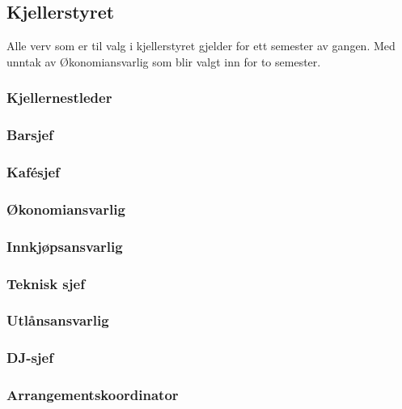\documentclass[10pt,norsk,a4paper,usenames,dvipsnames]{article}
\begin{document}
    \begin{minipage}[t]{0.49\textwidth}
        \subsection{Kjellerstyret} %
        Alle verv som er til valg i kjellerstyret gjelder for ett semester av gangen. Med unntak av Økonomiansvarlig som blir valgt inn for to semester.
        
        \subsubsection{Kjellernestleder}
        
        
        \subsubsection{Barsjef}
        
        
        \subsubsection{Kafésjef}
        
        
        \subsubsection{Økonomiansvarlig}
        
        
        \subsubsection{Innkjøpsansvarlig}
        
        
        \subsubsection{Teknisk sjef}
        
        
        \subsubsection{Utlånsansvarlig}
        
        
        \subsubsection{DJ-sjef}
        
        
        \subsubsection{Arrangementskoordinator}
    \end{minipage}
\end{document}
